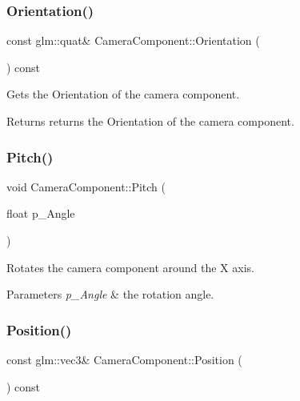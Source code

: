 \mbox{\label{class_camera_component_ab87523de9e8a9070e69c852e0cae4493}} 
\subsubsection{\texorpdfstring{Orientation()}{Orientation()}}
{\footnotesize\ttfamily const glm\+::quat\& Camera\+Component\+::\+Orientation (\begin{DoxyParamCaption}{ }\end{DoxyParamCaption}) const\hspace{0.3cm}{\ttfamily [inline]}}



Gets the Orientation of the camera component. 

\begin{DoxyReturn}{Returns}
returns the Orientation of the camera component. 
\end{DoxyReturn}
\mbox{\label{class_camera_component_aaad279e1a0e4050cff1ed8072d40f7b1}} 
\subsubsection{\texorpdfstring{Pitch()}{Pitch()}}
{\footnotesize\ttfamily void Camera\+Component\+::\+Pitch (\begin{DoxyParamCaption}\item[{float}]{p\+\_\+\+Angle }\end{DoxyParamCaption})\hspace{0.3cm}{\ttfamily [inline]}}



Rotates the camera component around the X axis. 


\begin{DoxyParams}{Parameters}
{\em p\+\_\+\+Angle} & the rotation angle. \\
\hline
\end{DoxyParams}
\mbox{\label{class_camera_component_ada9efd239599d32ad9ec5fa92c26c38c}} 
\subsubsection{\texorpdfstring{Position()}{Position()}}
{\footnotesize\ttfamily const glm\+::vec3\& Camera\+Component\+::\+Position (\begin{DoxyParamCaption}{ }\end{DoxyParamCaption}) const\hspace{0.3cm}{\ttfamily [inline]}}



